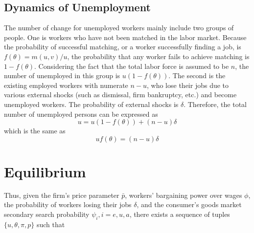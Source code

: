\documentclass[ %
    final,
    scrbook,
    listoffigures,
    listoftables, 
    glossary]{cu-thesis}
\begin{document}
\subsection{Dynamics of Unemployment}
The number of change for unemployed workers mainly include two groups of people. One is workers who have not been matched in the labor market. Because the probability of successful matching, or a worker successfully finding a job, is $f(\theta)=m(u,v)/u$, the probability that any worker fails to achieve matching is $1-f(\theta)$. Considering the fact that the total labor force is assumed to be $n$, the number of unemployed in this group is $u(1-f(\theta))$. The second is the existing employed workers with numerate $n-u$, who lose their jobs due to various external shocks (such as dismissal, firm bankruptcy, etc.) and become unemployed workers. The probability of external shocks is $\delta$. Therefore, the total number of unemployed persons can be expressed as
\begin{equation}
u = u(1-f(\theta))+(n-u)\delta
\end{equation}
which is the same as 
\begin{equation} \label{eq7}
uf(\theta) = (n-u)\delta
\end{equation}

\section{Equilibrium}
Thus, given the firm’s price parameter $\bar{p}$, workers’ bargaining power over wages $\phi$, the probability of workers losing their jobs $\delta$, and the consumer’s goods market secondary search probability $\psi_i, i=e,u,a$, there exists a sequence of tuples $\{u,\theta,\pi,p\}$ 
such that
\end{document}

